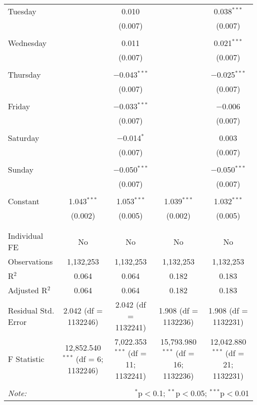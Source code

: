 \documentclass[
]{article}
\begin{document}
\begin{table}[!htbp]
{\begin{tabular}{@{\extracolsep{5pt}}lcccc}
 Tuesday &  & 0.010 &  & 0.038$^{***}$ \\ 
  &  & (0.007) &  & (0.007) \\ 
  & & & & \\ 
 Wednesday &  & 0.011 &  & 0.021$^{***}$ \\ 
  &  & (0.007) &  & (0.007) \\ 
  & & & & \\ 
 Thursday &  & $-$0.043$^{***}$ &  & $-$0.025$^{***}$ \\ 
  &  & (0.007) &  & (0.007) \\ 
  & & & & \\ 
 Friday &  & $-$0.033$^{***}$ &  & $-$0.006 \\ 
  &  & (0.007) &  & (0.007) \\ 
  & & & & \\ 
 Saturday &  & $-$0.014$^{*}$ &  & 0.003 \\ 
  &  & (0.007) &  & (0.007) \\ 
  & & & & \\ 
 Sunday &  & $-$0.050$^{***}$ &  & $-$0.050$^{***}$ \\ 
  &  & (0.007) &  & (0.007) \\ 
  & & & & \\ 
 Constant & 1.043$^{***}$ & 1.053$^{***}$ & 1.039$^{***}$ & 1.032$^{***}$ \\ 
  & (0.002) & (0.005) & (0.002) & (0.005) \\ 
  & & & & \\ 
\hline \\[-1.8ex] 
Individual FE & No & No & No & No \\ 
Observations & 1,132,253 & 1,132,253 & 1,132,253 & 1,132,253 \\ 
R$^{2}$ & 0.064 & 0.064 & 0.182 & 0.183 \\ 
Adjusted R$^{2}$ & 0.064 & 0.064 & 0.182 & 0.183 \\ 
Residual Std. Error & 2.042 (df = 1132246) & 2.042 (df = 1132241) & 1.908 (df = 1132236) & 1.908 (df = 1132231) \\ 
F Statistic & 12,852.540$^{***}$ (df = 6; 1132246) & 7,022.353$^{***}$ (df = 11; 1132241) & 15,793.980$^{***}$ (df = 16; 1132236) & 12,042.880$^{***}$ (df = 21; 1132231) \\ 
\hline 
\hline \\[-1.8ex] 
\textit{Note:}  & \multicolumn{4}{r}{$^{*}$p$<$0.1; $^{**}$p$<$0.05; $^{***}$p$<$0.01} \\ 
\end{tabular}
} 
\end{table} 
\newpage
\end{document}
